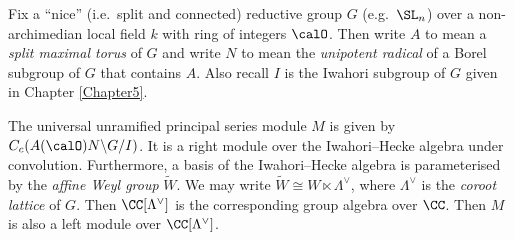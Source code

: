 Fix a ``nice'' (i.e.\ split and connected) reductive group $G$ (e.g.\ $\SL_n$) over a non-archimedian local field $k$ with ring of integers $\calO$.
Then write $A$ to mean a \emph{split maximal torus} of $G$ and write $N$ to mean the \emph{unipotent radical} of a Borel subgroup of $G$ that contains $A$.
Also recall $I$ is the Iwahori subgroup of $G$ given in Chapter \ref{Chapter5}.

The universal unramified principal series module $M$ is given by $C_c(A(\calO)N\backslash G/I)$.
It is a right module over the Iwahori--Hecke algebra under convolution.
Furthermore, a basis of the Iwahori--Hecke algebra is parameterised by the \emph{affine Weyl group} $\widetilde{W}$.
We may write $\widetilde{W} \cong W \ltimes \Lambda^\vee$, where $\Lambda^\vee$ is the \emph{coroot lattice} of $G$.
Then $\CC[\Lambda^\vee]$ is the corresponding group algebra over $\CC$.
Then $M$ is also a left module over $\CC[\Lambda^\vee]$.

\newpage
{}
